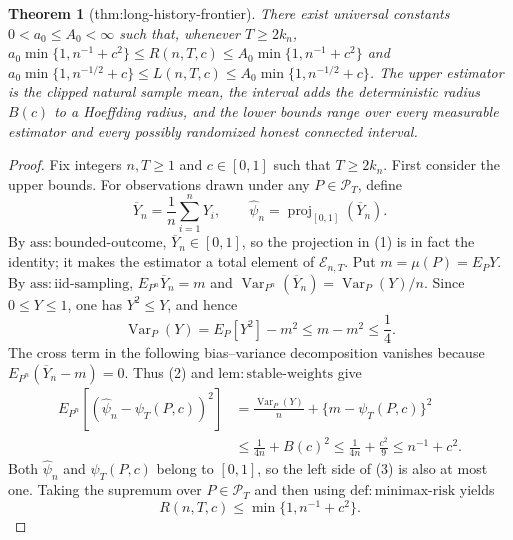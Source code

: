 \documentclass{article}
\newtheorem{theorem}{Theorem}
\begin{document}
\begin{theorem}[thm:long-history-frontier]\label{thm:long-history-frontier}
There exist universal constants \(0<a_0\leq A_0<\infty\) such that, whenever \(T\geq2k_n\), \(a_0\min\{1,n^{-1}+c^2\}\leq R(n,T,c)\leq A_0\min\{1,n^{-1}+c^2\}\) and \(a_0\min\{1,n^{-1/2}+c\}\leq L(n,T,c)\leq A_0\min\{1,n^{-1/2}+c\}\). The upper estimator is the clipped natural sample mean, the interval adds the deterministic radius \(B(c)\) to a Hoeffding radius, and the lower bounds range over every measurable estimator and every possibly randomized honest connected interval.
\end{theorem}
\begin{proof}
Fix integers \(n,T\geq 1\) and \(c\in[0,1]\) such that \(T\geq 2k_n\).  First consider the upper bounds.  For observations drawn under any \(P\in\mathcal P_T\), define
\[
\overline Y_n=\frac1n\sum_{i=1}^nY_i,
\qquad
\widehat\psi_n=\operatorname{proj}_{[0,1]}(\overline Y_n).
\tag{1}
\]
By \(\mathrm{ass:bounded\text{-}outcome}\), \(\overline Y_n\in[0,1]\), so the projection in (1) is in fact the identity; it makes the estimator a total element of \(\mathcal E_{n,T}\).  Put \(m=\mu(P)=E_PY\).  By \(\mathrm{ass:iid\text{-}sampling}\), \(E_{P^n}\overline Y_n=m\) and \(\operatorname{Var}_{P^n}(\overline Y_n)=\operatorname{Var}_P(Y)/n\).  Since \(0\leq Y\leq1\), one has \(Y^2\leq Y\), and hence
\[
\operatorname{Var}_P(Y)=E_P[Y^2]-m^2
\leq m-m^2\leq\frac14.
\tag{2}
\]
The cross term in the following bias--variance decomposition vanishes because \(E_{P^n}(\overline Y_n-m)=0\).  Thus (2) and \(\mathrm{lem:stable\text{-}weights}\) give
\[
\begin{aligned}
E_{P^n}\!\left[(\widehat\psi_n-\psi_T(P,c))^2\right]
&=\frac{\operatorname{Var}_P(Y)}n+\{m-\psi_T(P,c)\}^2\\
&\leq\frac1{4n}+B(c)^2
\leq\frac1{4n}+\frac{c^2}{9}
\leq n^{-1}+c^2.
\end{aligned}
\tag{3}
\]
Both \(\widehat\psi_n\) and \(\psi_T(P,c)\) belong to \([0,1]\), so the left side of (3) is also at most one.  Taking the supremum over \(P\in\mathcal P_T\) and then using \(\mathrm{def:minimax\text{-}risk}\) yields
\[
R(n,T,c)\leq\min\{1,n^{-1}+c^2\}.
\tag{4}
\]


\end{proof}
\end{document}
